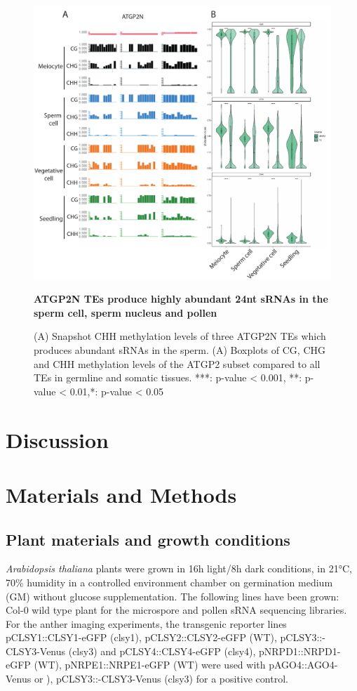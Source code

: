 \begin{figure}[htbp!] 
\centering    
    \includegraphics[width=1\textwidth]{Chapter2/Figs/Figure14_TE_methylation.pdf}
\caption{\textbf{ATGP2N TEs produce highly abundant 24nt sRNAs in the sperm cell, sperm nucleus and pollen}}
\label{fig:TE_methylation}
\captionsetup{font=small}
    \caption*{(A) Snapshot CHH methylation levels of three ATGP2N TEs which produces abundant sRNAs in the sperm. (A) Boxplots of CG, CHG and CHH methylation levels of the ATGP2 subset compared to all TEs in germline and somatic tissues. ***: p-value < 0.001, **: p-value < 0.01,*: p-value < 0.05}
\end{figure}



\section{Discussion}


\section{Materials and Methods}

\subsection{Plant materials and growth conditions}

\textit{Arabidopsis thaliana} plants were grown in 16h light/8h dark conditions, in 21°C, 70\% humidity in a controlled environment chamber on germination medium (GM) without glucose supplementation. The following lines have been grown: Col-0 wild type plant for the microspore and pollen sRNA sequencing libraries. For the anther imaging experiments, the transgenic reporter lines pCLSY1::CLSY1-eGFP (clsy1), pCLSY2::CLSY2-eGFP (WT), pCLSY3::-CLSY3-Venus (clsy3) and pCLSY4::CLSY4-eGFP (clsy4), pNRPD1::NRPD1-eGFP (WT), pNRPE1::NRPE1-eGFP (WT) were used with pAGO4::AGO4-Venus or ), pCLSY3::-CLSY3-Venus (clsy3) for a positive control.


